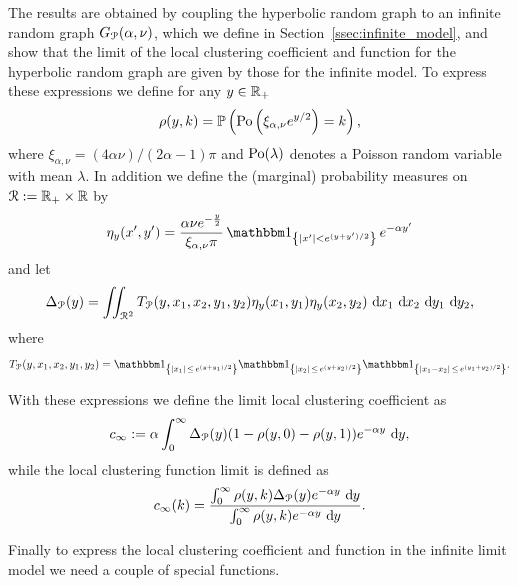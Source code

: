 The results are obtained by coupling the hyperbolic random graph to an infinite random graph $G_{{\mathcal P}}(\alpha,\nu)$, which we define in Section~\ref{ssec:infinite_model}, and show that the limit of the local clustering coefficient and function for the hyperbolic random graph are given by those for the infinite model. To express these expressions we define for any $y \in {\ensuremath{\mathbb R}}_+$ 
\[
	\rho(y,k) = \mathbb{P}\left({\mathrm{Po}}\left(\xi_{\alpha,\nu} e^{y/2}\right) = k\right),
\]
where $\xi_{\alpha,\nu} = (4\alpha \nu)/(2\alpha - 1)\pi$ and ${\mathrm{Po}}(\lambda)$ denotes a Poisson random variable with mean $\lambda$. In addition we define the (marginal) probability measures on ${\mathcal R} := {\mathbb R}_+ \times {\ensuremath{\mathbb R}}$ by  
\[
	\eta_{y}(x^\prime, y^\prime) = \frac{\alpha \nu e^{-\frac{y}{2}}}{\xi_{\alpha,\nu} \pi} \, \ind{|x^\prime|<e^{(y+y^\prime)/2}} \, e^{-\alpha y^\prime}
\]	
and let
\begin{equation}\label{eq:def_delta_p}
	\Delta_{{\mathcal P}}(y) = \iint_{{\mathcal R}^2} T_{{\mathcal P}}(y, x_1, x_2, y_1, y_2) \eta_{y}(x_1,y_1)\eta_{y}(x_2,y_2) \operatorname{\, \mathrm{d}\hspace{-2pt}} x_1 \operatorname{\, \mathrm{d}\hspace{-2pt}} x_2  \operatorname{\, \mathrm{d}\hspace{-2pt}} y_1  \operatorname{\, \mathrm{d}\hspace{-2pt}} y_2,
\end{equation}
where 
\[
	T_\Pcal(y, x_1, x_2, y_1, y_2) 
	= \ind{|x_1| \, \le \, e^{(y+y_1)/2}}\ind{|x_2| \, \le \, e^{(y+y_2)/2}}\ind{|x_1-x_2| \, \le \, e^{(y_1+y_2)/2}}.
\]

With these expressions we define the limit local clustering coefficient as
\begin{equation}\label{eq:def_average_clustering_infinite_model}
	c_\infty := \alpha \int_0^\infty \Delta_{{\mathcal P}}(y) (1 - \rho(y,0) - \rho(y,1)) e^{-\alpha y} \operatorname{\, \mathrm{d}\hspace{-2pt}} y,
\end{equation}
while the local clustering function limit is defined as
\begin{equation}\label{eq:def_c_infty_k}
	c_\infty(k) = \frac{\int_0^\infty \rho(y,k) \Delta_{{\mathcal P}}(y) e^{-\alpha y} \operatorname{\, \mathrm{d}\hspace{-2pt}} y}{\int_0^\infty \rho(y,k) e^{-\alpha y} \operatorname{\, \mathrm{d}\hspace{-2pt}} y}.
\end{equation}

Finally to express the local clustering coefficient and function in the infinite limit model we need a couple of special functions. 


